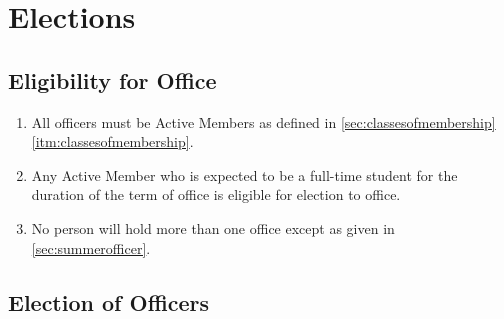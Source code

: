 \documentclass[12pt,letterpaper,oneside]{book}
\begin{document}
\chapter{Elections}

\section{Eligibility for Office} \label{sec:eligibilityforoffice}

\begin{enumerate}

\item All officers must be Active Members as defined in \cref{sec:classesofmembership} \cref{itm:classesofmembership}.
\item Any Active Member who is expected to be a full-time student for the duration of the term of office is eligible for election to office.
\item No person will hold more than one office except as given in \cref{sec:summerofficer}.

\end{enumerate}

\section{Election of Officers} \label{sec:electionprocedures}
\end{document}
